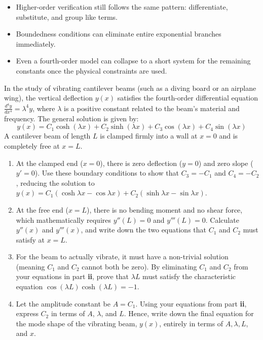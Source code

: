 \begin{takeaways}
\begin{itemize}[leftmargin=*]
    \item Higher-order verification still follows the same pattern: differentiate, substitute, and group like terms.
    \item Boundedness conditions can eliminate entire exponential branches immediately.
    \item Even a fourth-order model can collapse to a short system for the remaining constants once the physical constraints are used.
\end{itemize}
\end{takeaways}

\begin{problem}
In the study of vibrating cantilever beams (such as a diving board or an airplane wing), the vertical deflection $y(x)$ satisfies the fourth-order differential equation $\frac{d^4y}{dx^4} = \lambda^4 y$, where $\lambda$ is a positive constant related to the beam's material and frequency. The general solution is given by:
\[ y(x) = C_1 \cosh(\lambda x) + C_2 \sinh(\lambda x) + C_3 \cos(\lambda x) + C_4 \sin(\lambda x) \]
A cantilever beam of length $L$ is clamped firmly into a wall at $x=0$ and is completely free at $x=L$. 

\begin{enumerate}
    \item[\textbf{i}] At the clamped end ($x=0$), there is zero deflection ($y=0$) and zero slope ($y'=0$). Use these boundary conditions to show that $C_3 = -C_1$ and $C_4 = -C_2$, reducing the solution to $y(x) = C_1(\cosh \lambda x - \cos \lambda x) + C_2(\sinh \lambda x - \sin \lambda x)$.
    \item[\textbf{ii}] At the free end ($x=L$), there is no bending moment and no shear force, which mathematically requires $y''(L) = 0$ and $y'''(L) = 0$. Calculate $y''(x)$ and $y'''(x)$, and write down the two equations that $C_1$ and $C_2$ must satisfy at $x=L$.
    \item[\textbf{iii}] For the beam to actually vibrate, it must have a non-trivial solution (meaning $C_1$ and $C_2$ cannot both be zero). By eliminating $C_1$ and $C_2$ from your equations in part \textbf{ii}, prove that $\lambda L$ must satisfy the characteristic equation $\cos(\lambda L)\cosh(\lambda L) = -1$.
    \item[\textbf{iv}] Let the amplitude constant be $A = C_1$. Using your equations from part \textbf{ii}, express $C_2$ in terms of $A$, $\lambda$, and $L$. Hence, write down the final equation for the mode shape of the vibrating beam, $y(x)$, entirely in terms of $A, \lambda, L$, and $x$.
\end{enumerate}
\end{problem}

